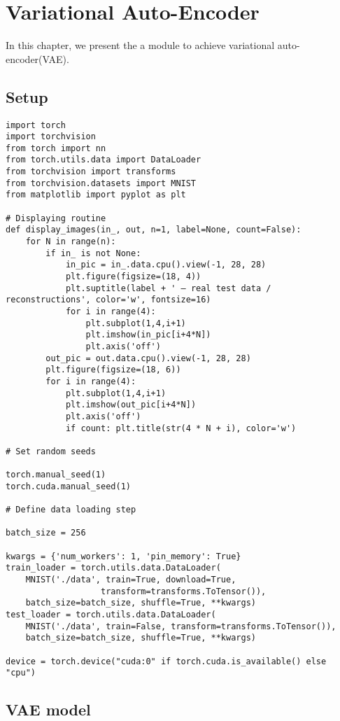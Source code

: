 \chapter{Variational Auto-Encoder}

In this chapter, we present the a module to achieve variational auto-encoder(VAE). 
\section{Setup}
\begin{verbatim}
import torch
import torchvision
from torch import nn
from torch.utils.data import DataLoader
from torchvision import transforms
from torchvision.datasets import MNIST
from matplotlib import pyplot as plt

# Displaying routine
def display_images(in_, out, n=1, label=None, count=False):
    for N in range(n):
        if in_ is not None:
            in_pic = in_.data.cpu().view(-1, 28, 28)
            plt.figure(figsize=(18, 4))
            plt.suptitle(label + ' – real test data / reconstructions', color='w', fontsize=16)
            for i in range(4):
                plt.subplot(1,4,i+1)
                plt.imshow(in_pic[i+4*N])
                plt.axis('off')
        out_pic = out.data.cpu().view(-1, 28, 28)
        plt.figure(figsize=(18, 6))
        for i in range(4):
            plt.subplot(1,4,i+1)
            plt.imshow(out_pic[i+4*N])
            plt.axis('off')
            if count: plt.title(str(4 * N + i), color='w')
            
# Set random seeds

torch.manual_seed(1)
torch.cuda.manual_seed(1)

# Define data loading step

batch_size = 256

kwargs = {'num_workers': 1, 'pin_memory': True}
train_loader = torch.utils.data.DataLoader(
    MNIST('./data', train=True, download=True,
                   transform=transforms.ToTensor()),
    batch_size=batch_size, shuffle=True, **kwargs)
test_loader = torch.utils.data.DataLoader(
    MNIST('./data', train=False, transform=transforms.ToTensor()),
    batch_size=batch_size, shuffle=True, **kwargs)
    
device = torch.device("cuda:0" if torch.cuda.is_available() else "cpu")
\end{verbatim}

\section{VAE model}

